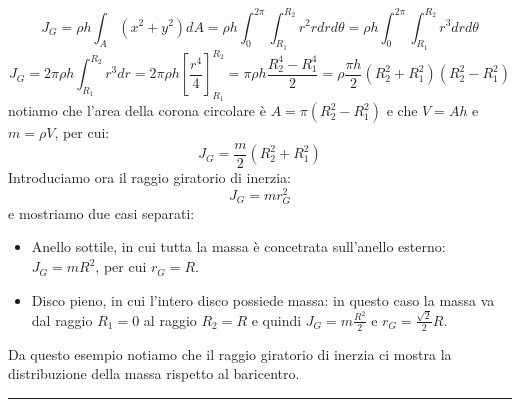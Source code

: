 \[
    J_G = \rho h \int_A (x^2 + y^2) dA = \rho h \int_{0}^{2\pi} \int_{R_1}^{R_2} r^2 r d r d \theta = \rho h \int_{0}^{2\pi} \int_{R_1}^{R_2} r^3 d r d \theta
\]
\[
    J_G = 2 \pi \rho h \int_{R_1}^{R_2} r^3 dr = 2 \pi \rho h \left[\frac{r^4}{4}\right]_{R_1}^{R_2} = \pi \rho h \frac{R_2^4 - R_1^4}{2} = \rho \frac{\pi h }{2} (R_2^2 + R_1^2) (R_2^2 - R_1^2)
\]
notiamo che l'area della corona circolare è $A = \pi (R_2^2 -R_1^2)$ e che $V = A h$ e $m = \rho V$, per cui:
\[
    J_G = \frac{m}{2}(R_2^2 + R_1^2)
\]
Introduciamo ora il raggio giratorio di inerzia:
\[
    J_G = m r_G^2
\]
e mostriamo due casi separati:
\begin{itemize}
    \item Anello sottile, in cui tutta la massa è concetrata sull'anello esterno: $J_G = m R^2$, per cui $r_G = R$.
    \item Disco pieno, in cui l'intero disco possiede massa: in questo caso la massa va dal raggio $R_1= 0$ al raggio $R_2 = R$ e quindi $J_G = m \frac{R^2}{2}$ e $r_G = \frac{\sqrt{2}}{2}R$.
\end{itemize}
Da questo esempio notiamo che il raggio giratorio di inerzia ci mostra la distribuzione della massa rispetto al baricentro.\newline
\rule{\textwidth}{0,4pt}